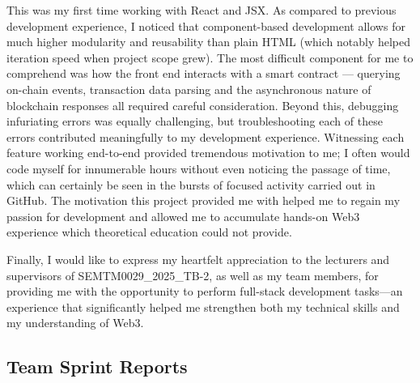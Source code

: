 \documentclass[runningheads]{llncs}
\begin{document}
	This was my first time working with React and JSX. As compared to previous development experience, I noticed that component-based development allows for much higher modularity and reusability than plain HTML (which notably helped iteration speed when project scope grew). The most difficult component for me to comprehend was how the front end interacts with a smart contract — querying on-chain events, transaction data parsing and the asynchronous nature of blockchain responses all required careful consideration. Beyond this, debugging infuriating errors was equally challenging, but troubleshooting each of these errors contributed meaningfully to my development experience. Witnessing each feature working end-to-end provided tremendous motivation to me; I often would code myself for innumerable hours without even noticing the passage of time, which can certainly be seen in the bursts of focused activity carried out in GitHub. The motivation this project provided me with helped me to regain my passion for development and allowed me to accumulate hands-on Web3 experience which theoretical education could not provide.
	
	Finally, I would like to express my heartfelt appreciation to the lecturers and supervisors of SEMTM0029\_2025\_TB-2, as well as my team members, for providing me with the opportunity to perform full-stack development tasks---an experience that significantly helped me strengthen both my technical skills and my understanding of Web3.
	
	
	
	
	\newpage

	\subsection{Team Sprint Reports}

	
	
	
	
	
	
	
	
	
	
\end{document}
